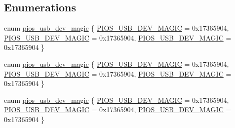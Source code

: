 \subsection*{\-Enumerations}
\begin{DoxyCompactItemize}
\item 
enum \hyperlink{group___p_i_o_s___u_s_b_ga388809c6af586364da35c0e34ddd2a53}{pios\-\_\-usb\-\_\-dev\-\_\-magic} \{ \hyperlink{group___p_i_o_s___u_s_b_gga388809c6af586364da35c0e34ddd2a53a3bb26b80e8ca1ed00d112f1dd1fe7fa4}{\-P\-I\-O\-S\-\_\-\-U\-S\-B\-\_\-\-D\-E\-V\-\_\-\-M\-A\-G\-I\-C} =  0x17365904, 
\hyperlink{group___p_i_o_s___u_s_b_gga388809c6af586364da35c0e34ddd2a53a3bb26b80e8ca1ed00d112f1dd1fe7fa4}{\-P\-I\-O\-S\-\_\-\-U\-S\-B\-\_\-\-D\-E\-V\-\_\-\-M\-A\-G\-I\-C} =  0x17365904, 
\hyperlink{group___p_i_o_s___u_s_b_gga388809c6af586364da35c0e34ddd2a53a3bb26b80e8ca1ed00d112f1dd1fe7fa4}{\-P\-I\-O\-S\-\_\-\-U\-S\-B\-\_\-\-D\-E\-V\-\_\-\-M\-A\-G\-I\-C} =  0x17365904
 \}
\item 
enum \hyperlink{group___p_i_o_s___u_s_b_ga388809c6af586364da35c0e34ddd2a53}{pios\-\_\-usb\-\_\-dev\-\_\-magic} \{ \hyperlink{group___p_i_o_s___u_s_b_gga388809c6af586364da35c0e34ddd2a53a3bb26b80e8ca1ed00d112f1dd1fe7fa4}{\-P\-I\-O\-S\-\_\-\-U\-S\-B\-\_\-\-D\-E\-V\-\_\-\-M\-A\-G\-I\-C} =  0x17365904, 
\hyperlink{group___p_i_o_s___u_s_b_gga388809c6af586364da35c0e34ddd2a53a3bb26b80e8ca1ed00d112f1dd1fe7fa4}{\-P\-I\-O\-S\-\_\-\-U\-S\-B\-\_\-\-D\-E\-V\-\_\-\-M\-A\-G\-I\-C} =  0x17365904, 
\hyperlink{group___p_i_o_s___u_s_b_gga388809c6af586364da35c0e34ddd2a53a3bb26b80e8ca1ed00d112f1dd1fe7fa4}{\-P\-I\-O\-S\-\_\-\-U\-S\-B\-\_\-\-D\-E\-V\-\_\-\-M\-A\-G\-I\-C} =  0x17365904
 \}
\item 
enum \hyperlink{group___p_i_o_s___u_s_b_ga388809c6af586364da35c0e34ddd2a53}{pios\-\_\-usb\-\_\-dev\-\_\-magic} \{ \hyperlink{group___p_i_o_s___u_s_b_gga388809c6af586364da35c0e34ddd2a53a3bb26b80e8ca1ed00d112f1dd1fe7fa4}{\-P\-I\-O\-S\-\_\-\-U\-S\-B\-\_\-\-D\-E\-V\-\_\-\-M\-A\-G\-I\-C} =  0x17365904, 
\hyperlink{group___p_i_o_s___u_s_b_gga388809c6af586364da35c0e34ddd2a53a3bb26b80e8ca1ed00d112f1dd1fe7fa4}{\-P\-I\-O\-S\-\_\-\-U\-S\-B\-\_\-\-D\-E\-V\-\_\-\-M\-A\-G\-I\-C} =  0x17365904, 
\hyperlink{group___p_i_o_s___u_s_b_gga388809c6af586364da35c0e34ddd2a53a3bb26b80e8ca1ed00d112f1dd1fe7fa4}{\-P\-I\-O\-S\-\_\-\-U\-S\-B\-\_\-\-D\-E\-V\-\_\-\-M\-A\-G\-I\-C} =  0x17365904
 \}
\end{DoxyCompactItemize}

